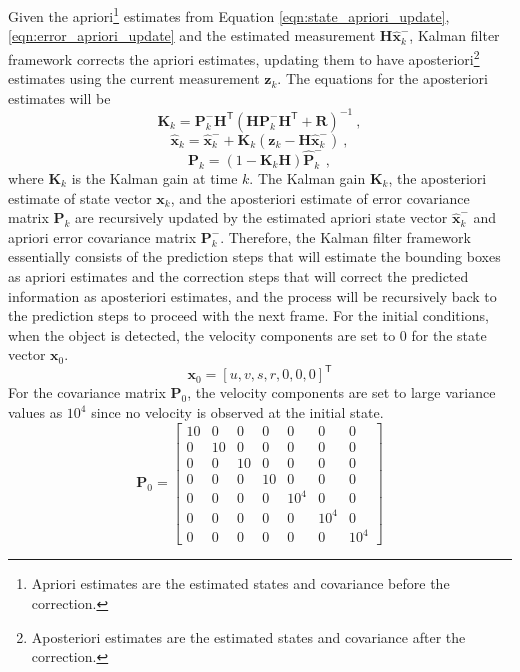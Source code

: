 Given the apriori\footnote{Apriori estimates are the estimated states and covariance before the correction.} estimates from Equation \eqref{eqn:state_apriori_update}, \eqref{eqn:error_apriori_update} and the estimated measurement $\mathbf{H} \mathbf{\hat{x}}_{k}^-$, Kalman filter framework corrects the apriori estimates, updating them to have aposteriori\footnote{Aposteriori estimates are the estimated states and covariance after the correction.} estimates using the current measurement $\mathbf{z}_k$. The equations for the aposteriori estimates will be
\begin{equation}
\mathbf{K}_{k} = \mathbf{P}_{k}^{-} \mathbf{H}^\mathsf{T} (\mathbf{H} \mathbf{P}_{k}^{-} \mathbf{H}^\mathsf{T} + \mathbf{R} )^{-1} ~ ,
\label{eqn:Kalman_gain_update}
\end{equation}
\begin{equation}
\mathbf{\hat{x}}_{k} = \mathbf{\hat{x}}_{k}^- + \mathbf{K}_{k} (\mathbf{z}_k - \mathbf{H} \mathbf{\hat{x}}_{k}^-) ~ ,
\label{eqn:state_aposteriori_estimate}
\end{equation}
\begin{equation}
\mathbf{P}_k = (1 - \mathbf{K}_k \mathbf{H} ) \mathbf{\hat{P}}_k^- ~ ,
\label{eqn:error_aposteriori_estimate}
\end{equation}
where $\mathbf{K}_{k}$ is the Kalman gain at time $k$. The Kalman gain $\mathbf{K}_k$, the aposteriori estimate of state vector $\mathbf{x}_k$, and the aposteriori estimate of error covariance matrix $\mathbf{P}_k$ are recursively updated by the estimated apriori state vector $\mathbf{\hat{x}}_{k}^{-}$ and apriori error covariance matrix $\mathbf{P}_{k}^{-}$. Therefore, the Kalman filter framework essentially consists of the prediction steps that will estimate the bounding boxes as apriori estimates and the correction steps that will correct the predicted information as aposteriori estimates, and the process will be recursively back to the prediction steps to proceed with the next frame. For the initial conditions, when the object is detected, the velocity components are set to 0 for the state vector $\mathbf{x}_0$.
\begin{equation}
\mathbf{x}_{0} = [u, v, s, r, 0, 0, 0]^\mathsf{T}
\label{eqn:x_0}
\end{equation}
For the covariance matrix $\mathbf{P}_0$, the velocity components are set to large variance values as $10^4$ since no velocity is observed at the initial state.
\begin{equation}
\mathbf{P}_0 = \left[ \begin{matrix}   
  10  &  0  &  0  &  0  &  0  &  0  &  0 \\
  0  &  10  &  0  &  0  &  0  &  0  &  0 \\
  0  &  0  &  10  &  0  &  0  &  0  &  0 \\
  0  &  0  &  0  &  10  &  0  &  0  &  0 \\
  0  &  0  &  0  &  0  &  10^4  &  0  &  0 \\
  0  &  0  &  0  &  0  &  0  &  10^4  &  0 \\
  0  &  0  &  0  &  0  &  0  &  0  &  10^4 
  \end{matrix} \right]
\label{eqn:P_0}
\end{equation}
